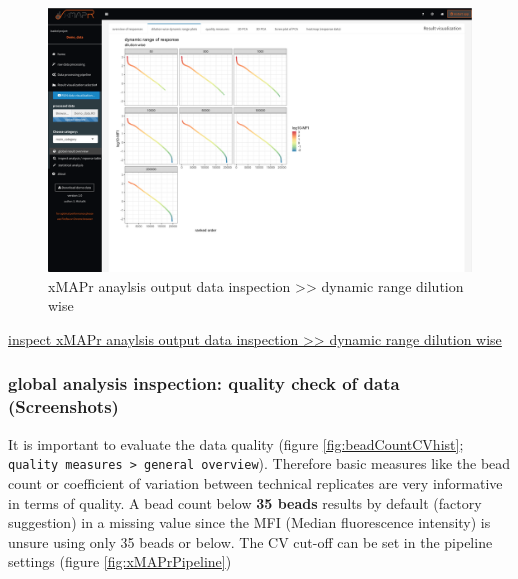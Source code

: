 \documentclass[]{book}
\theoremstyle{definition}
\theoremstyle{definition}
\theoremstyle{definition}
\theoremstyle{remark}
\begin{document}
\begin{figure}

{\centering \includegraphics[width=50.5in]{figures/global_result_overview_dyn_range_dilution_wise} 

}

\caption{xMAPr anaylsis output data inspection >> dynamic range dilution wise}\label{fig:dynamicRangeDilutionWise}
\end{figure}

\href{figures/global_result_overview_dyn_range_dilution_wise.png}{inspect
xMAPr anaylsis output data inspection \textgreater{}\textgreater{}
dynamic range dilution wise}

\subsubsection{global analysis inspection: quality check of data
(Screenshots)}\label{global-analysis-inspection-quality-check-of-data-screenshots}

It is important to evaluate the data quality (figure
\ref{fig:beadCountCVhist};
\texttt{quality\ measures\ \textgreater{}\ general\ overview}).
Therefore basic measures like the bead count or coefficient of variation
between technical replicates are very informative in terms of quality. A
bead count below \textbf{35 beads} results by default (factory
suggestion) in a missing value since the MFI (Median fluorescence
intensity) is unsure using only 35 beads or below. The CV cut-off can be
set in the pipeline settings (figure \ref{fig:xMAPrPipeline})
\end{document}
